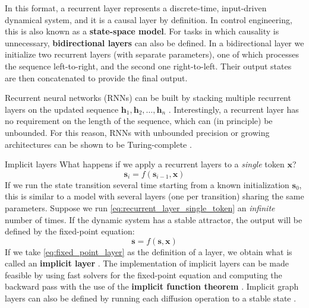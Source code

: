 %
In this format, a recurrent layer represents a discrete-time, input-driven dynamical system, and it is a causal layer by definition. In control engineering, this is also known as a \textbf{state-space model}. For tasks in which causality is unnecessary, \textbf{bidirectional layers} \cite{schuster1997bidirectional} can also be defined. In a bidirectional layer we initialize two recurrent layers (with separate parameters), one of which processes the sequence left-to-right, and the second one right-to-left. Their output states are then concatenated to provide the final output. 

Recurrent neural networks (RNNs) can be built by stacking multiple recurrent layers on the updated sequence $\mathbf{h}_1, \mathbf{h}_2, \ldots, \mathbf{h}_n$ \cite{pascanu2013construct}. Interestingly, a recurrent layer has no requirement on the length of the sequence, which can (in principle) be unbounded. For this reason, RNNs with unbounded precision or growing architectures can be shown to be Turing-complete \cite{chung2021turing}.

\begin{supportbox}{Implicit layers}
%
What happens if we apply a recurrent layers to a \textit{single} token $\mathbf{x}$?
%
\begin{equation}
\mathbf{s}_i = f(\mathbf{s}_{i-1}, \mathbf{x})
\label{eq:recurrent_layer_single_token}
\end{equation}
%
If we run the state transition several time starting from a known initialization $\mathbf{s}_0$, this is similar to a model with several layers (one per transition) sharing the same parameters. Suppose we run \eqref{eq:recurrent_layer_single_token} an \textit{infinite} number of times. If the dynamic system has a stable attractor, the output will be defined by the fixed-point equation:
%
\begin{equation}
\mathbf{s} = f(\mathbf{s}, \mathbf{x})
\label{eq:fixed_point_layer}
\end{equation}
%
If we take \eqref{eq:fixed_point_layer} as the definition of a layer, we obtain what is called an \textbf{implicit layer} \cite{bai2019deep}. The implementation of implicit layers can be made feasible by using fast solvers for the fixed-point equation and computing the backward pass with the use of the \textbf{implicit function theorem} \cite{bai2019deep}. Implicit graph layers can also be defined by running each diffusion operation to a stable state \cite{gori2005new,scarselli2008graph}. 
%
\end{supportbox}

